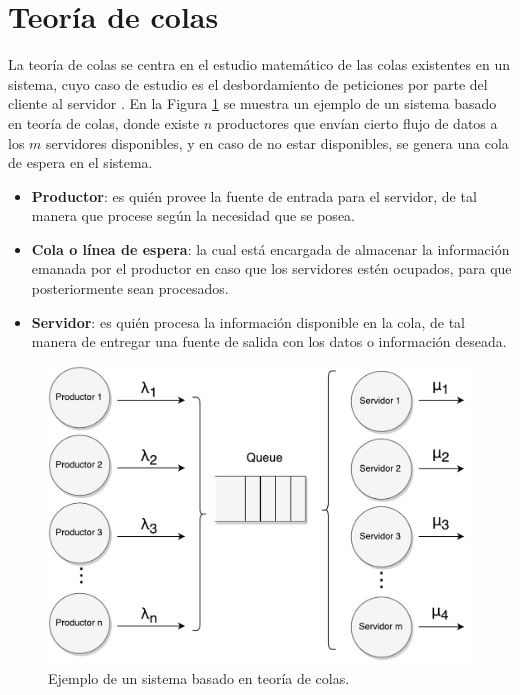 \section{Teoría de colas}
\label{sec:teoriaColas}

La teoría de colas se centra en el estudio matemático de las colas existentes en un sistema, cuyo caso de estudio es el desbordamiento de peticiones por parte del cliente al servidor \citep{queueingtheory}. En la Figura \ref{fig:teoriaColas} se muestra un ejemplo de un sistema basado en teoría de colas, donde existe $n$ productores que envían cierto flujo de datos a los $m$ servidores disponibles, y en caso de no estar disponibles, se genera una cola de espera en el sistema.

\begin{itemize}
	\item \textbf{Productor}: es quién provee la fuente de entrada para el servidor, de tal manera que procese según la necesidad que se posea.
	\item \textbf{Cola o línea de espera}: la cual está encargada de almacenar la información emanada por el productor en caso que los servidores estén ocupados, para que posteriormente sean procesados.
	\item \textbf{Servidor}: es quién procesa la información disponible en la cola, de tal manera de entregar una fuente de salida con los datos o información deseada.
\end{itemize}

\begin{figure}[!ht]
	\centering
	\includegraphics[scale=0.6]{images/TeoriaColas.pdf}
	\caption{Ejemplo de un sistema basado en teoría de colas.}
	\label{fig:teoriaColas}
\end{figure}

